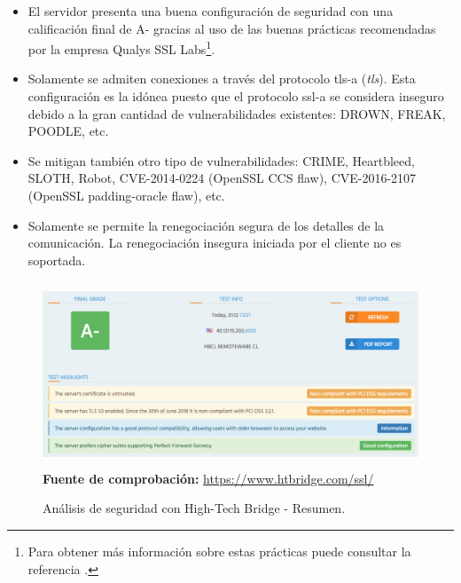 \documentclass[12pt,a4paper, twoside]{report}
\begin{document}
	\begin{itemize}
		\item El servidor presenta una buena configuración de seguridad con una calificación final de A- gracias al uso de las buenas prácticas recomendadas por la empresa Qualys SSL Labs\footnote{Para obtener más información sobre estas prácticas puede consultar la referencia \cite{ssllabs:best}.}.
		\item Solamente se admiten conexiones a través del protocolo \gls{tls-a} (\textit{\gls{tls}}). Esta configuración es la idónea puesto que el protocolo \gls{ssl-a} se considera inseguro debido a la gran cantidad de vulnerabilidades existentes: DROWN, FREAK, POODLE, etc.
		\item Se mitigan también otro tipo de vulnerabilidades: CRIME, Heartbleed, SLOTH, Robot, CVE-2014-0224 (OpenSSL CCS flaw), CVE-2016-2107 (OpenSSL padding-oracle flaw), etc.
		\item Solamente se permite la renegociación segura de los detalles de la comunicación. La renegociación insegura iniciada por el cliente no es soportada.
	\end{itemize}
					
	\begin{figure}[!ht]   
		\caption{Análisis de seguridad con High-Tech Bridge - Resumen.} 
		
		\begin{center} 
 			\includegraphics[width=15cm,height=5.5cm]{Images/implement/htbridge1} \\
			\label{fig:htbridge1} 
			\textbf{Fuente de comprobación:} \url{https://www.htbridge.com/ssl/}
		\end{center}  
	\end{figure}	
		
\end{document}
